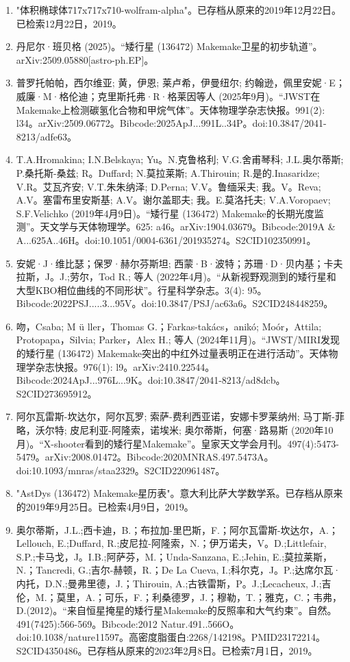 \begin{enumerate}
\item "体积椭球体717x717x710-wolfram-alpha"。已存档从原来的2019年12月22日。已检索12月22日，2019。
\item 丹尼尔·班贝格 (2025)。“矮行星 (136472) Makemake卫星的初步轨道”。arXiv:2509.05880[astro-ph.EP]。
\item 普罗托帕帕，西尔维亚; 黄，伊恩; 莱卢希，伊曼纽尔; 约翰逊，佩里安妮·E；威廉·M·格伦迪；克里斯托弗·R·格莱因等人 (2025年9月)。“JWST在Makemake上检测碳氢化合物和甲烷气体”。天体物理学杂志快报。991(2): l34。arXiv:2509.06772。Bibcode:2025ApJ...991L..34P。doi:10.3847/2041-8213/adfe63。
\item T.A.Hromakina; I.N.Belskaya; Yu。N.克鲁格利; V.G.舍甫琴科; J.L.奥尔蒂斯; P.桑托斯-桑兹; R。Duffard; N.莫拉莱斯; A.Thirouin; R.是的.Inasaridze; V.R。艾瓦齐安; V.T.朱朱纳泽; D.Perna; V.V。鲁缅采夫; 我。V。Reva; A.V。塞雷布里安斯基; A.V。谢尔盖耶夫; 我。E.莫洛托夫; V.A.Voropaev; S.F.Velichko (2019年4月9日)。“矮行星 (136472) Makemake的长期光度监测”。天文学与天体物理学。625: a46。arXiv:1904.03679。Bibcode:2019A & A...625A..46H。doi:10.1051/0004-6361/201935274。S2CID102350991。 
\item 安妮·J·维比瑟；保罗·赫尔芬斯坦; 西蒙·B·波特；苏珊·D·贝内基；卡夫拉斯，J。J.;劳尔，Tod R.; 等人 (2022年4月)。“从新视野观测到的矮行星和大型KBO相位曲线的不同形状”。行星科学杂志。3(4): 95。Bibcode:2022PSJ.....3...95V。doi:10.3847/PSJ/ac63a6。S2CID248448259。 
\item 吻，Csaba; M ü ller，Thomas G.；Farkas-takács，anikó; Moór，Attila; Protopapa，Silvia; Parker，Alex H.; 等人 (2024年11月)。“JWST/MIRI发现的矮行星 (136472) Makemake突出的中红外过量表明正在进行活动”。天体物理学杂志快报。976(1): l9。arXiv:2410.22544。Bibcode:2024ApJ...976L...9K。doi:10.3847/2041-8213/ad8dcb。S2CID273695912。 
\item 阿尔瓦雷斯-坎达尔，阿尔瓦罗; 索萨-费利西亚诺，安娜卡罗莱纳州; 马丁斯-菲略，沃尔特; 皮尼利亚-阿隆索，诺埃米; 奥尔蒂斯，何塞·路易斯 (2020年10月)。“X-shooter看到的矮行星Makemake”。皇家天文学会月刊。497(4):5473-5479。arXiv:2008.01472。Bibcode:2020MNRAS.497.5473A。doi:10.1093/mnras/staa2329。S2CID220961487。 
\item "AstDys (136472) Makemake星历表"。意大利比萨大学数学系。已存档从原来的2019年9月25日。已检索4月9日，2019。
\item 奥尔蒂斯，J.L.;西卡迪，B.；布拉加-里巴斯，F.；阿尔瓦雷斯-坎达尔，A.；Lellouch, E.;Duffard, R.;皮尼拉-阿隆索，N.；伊万诺夫，V。D.;Littlefair, S.P.;卡马戈，J。I.B.;阿萨芬，M.；Unda-Sanzana, E.;Jehin, E.;莫拉莱斯，N.；Tancredi, G.;吉尔-赫顿，R.；De La Cueva, I.;科尔克，J。P.;达席尔瓦·内托，D.N.;曼弗里德，J.；Thirouin, A.;古铁雷斯，P。J.;Lecacheux, J.;吉伦，M.；莫里，A.；可乐，F.；利桑德罗，J.；穆勒，T.；雅克，C.；韦弗，D.(2012)。“来自恒星掩星的矮行星Makemake的反照率和大气约束”。自然。491(7425):566-569。Bibcode:2012 Natur.491..566O。doi:10.1038/nature11597。高密度脂蛋白:2268/142198。PMID23172214。S2CID4350486。已存档从原来的2023年2月8日。已检索7月1日，2019。  

\end{enumerate}
